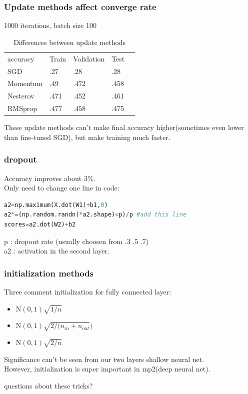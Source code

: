 \documentclass{beamer}
\begin{document}
\begin{frame}
\frametitle{Update methods affect converge rate}
1000 iterations, batch size 100
\begin{table}
\centering
\caption{Differences between update methods}
\begin{tabular}{lllll}
accuracy & Train & Validation & Test &  \\
SGD      & .27   & .28        & .28  &  \\
Momentum & .49   & .472       & .458 &  \\
Nesterov & .471  & .452       & .461 &  \\
RMSprop  & .477  & .458       & .475 & 
\end{tabular}
\end{table}
These update methods can't make final accuracy higher(sometimes even lower than fine-tuned SGD),
 but make training much faster.
\end{frame}
\begin{frame}[fragile]
 \frametitle{dropout}
 Accuracy improves about 3\%. \\
 Only need to change one line in code:
\begin{lstlisting}[language=python]
a2=np.maximum(X.dot(W1)+b1,0)
a2*=(np.random.randn(*a2.shape)<p)/p #add this line
scores=a2.dot(W2)+b2
\end{lstlisting}
p  : dropout rate (usually choosen from .3 .5 .7) \\
a2 : activation in the second layer.
\end{frame}


\begin{frame}
\frametitle{initialization methods}
Three comment initialization for fully connected layer:
\begin{itemize}
\item $\text{N}(0,1)\sqrt{1/n}$
\item $\text{N}(0,1)\sqrt{2/(n_{in} + n _{out}})$ 
\item $\text{N}(0,1)\sqrt{2/n}$
\end{itemize}
Significance can't be seen from our two layers shallow neural net.\\
However, initialization is super important in mp2(deep neural net).
\end{frame}

\begin{frame}
\begin{huge}\centerline{questions about these tricks?}\end{huge}
\end{frame}
\end{document}
